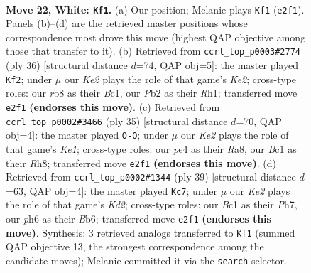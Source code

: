 \documentclass[11pt]{article}
\begin{document}
\clearpage

\begin{figure}[p]\centering
\begin{subfigure}{0.46\textwidth}\centering
\resizebox{\linewidth}{!}{%
\newchessgame
\chessboard[
  setfen={1r3r2/pp4k1/6pp/2pBb2n/4p1bP/N5P1/PP1PKP2/1RB1R3 w - - 2 22},
  showmover=false,
  pgfstyle=straightmove, color=movearrow, markmove={e2-f1}
]}
\caption{}
\end{subfigure}\hfill
\begin{subfigure}{0.46\textwidth}\centering
\resizebox{\linewidth}{!}{%
\newchessgame
\chessboard[
  setfen={3r1rk1/p1p3p1/2B2n1p/2b2b2/2p2P2/2N1P1PP/PP2K3/R1B4R w - - 2 19},
  showmover=false,
  pgfstyle=straightmove, color=movearrow, markmove={e2-f2}
]}
\caption{}
\end{subfigure}
\\[4pt]
\begin{subfigure}{0.46\textwidth}\centering
\resizebox{\linewidth}{!}{%
\newchessgame
\chessboard[
  setfen={r3k2r/5ppp/p2bb3/1pp1N3/P3nB2/8/1P2BPPP/R2R2K1 b kq - 2 18},
  showmover=false,
  pgfstyle=straightmove, color=movearrow, markmove={e8-g8}
]}
\caption{}
\end{subfigure}\hfill
\begin{subfigure}{0.46\textwidth}\centering
\resizebox{\linewidth}{!}{%
\newchessgame
\chessboard[
  setfen={r6r/pp1k2pp/1bpNbp2/4n3/7B/2P5/PPB2PPP/3RR1K1 b - - 3 20},
  showmover=false,
  pgfstyle=straightmove, color=movearrow, markmove={d7-c7}
]}
\caption{}
\end{subfigure}
\caption{\textbf{Move 22, White: \texttt{Kf1}.} (a) Our position; Melanie plays \texttt{Kf1} (\texttt{e2f1}). Panels (b)--(d) are the retrieved master positions whose correspondence most drove this move (highest QAP objective among those that transfer to it). (b) Retrieved from \texttt{ccrl\_top\_p0003\#2774} (ply 36) [structural distance $d$=74, QAP obj=5]: the master played \texttt{Kf2}; under $\mu$ our \emph{Ke2} plays the role of that game's \emph{Ke2}; cross-type roles: our \emph{r}b8 as their \emph{B}c1, our \emph{P}b2 as their \emph{R}h1; transferred move \texttt{e2f1} \textbf{(endorses this move)}. (c) Retrieved from \texttt{ccrl\_top\_p0002\#3466} (ply 35) [structural distance $d$=70, QAP obj=4]: the master played \texttt{O-O}; under $\mu$ our \emph{Ke2} plays the role of that game's \emph{Ke1}; cross-type roles: our \emph{p}e4 as their \emph{R}a8, our \emph{B}c1 as their \emph{R}h8; transferred move \texttt{e2f1} \textbf{(endorses this move)}. (d) Retrieved from \texttt{ccrl\_top\_p0002\#1344} (ply 39) [structural distance $d$=63, QAP obj=4]: the master played \texttt{Kc7}; under $\mu$ our \emph{Ke2} plays the role of that game's \emph{Kd2}; cross-type roles: our \emph{B}c1 as their \emph{P}h7, our \emph{p}h6 as their \emph{B}b6; transferred move \texttt{e2f1} \textbf{(endorses this move)}. Synthesis: 3 retrieved analogs transferred to \texttt{Kf1} (summed QAP objective 13, the strongest correspondence among the candidate moves); Melanie committed it via the \texttt{search} selector.}
\label{fig:thought-m42}
\end{figure}
\end{document}
